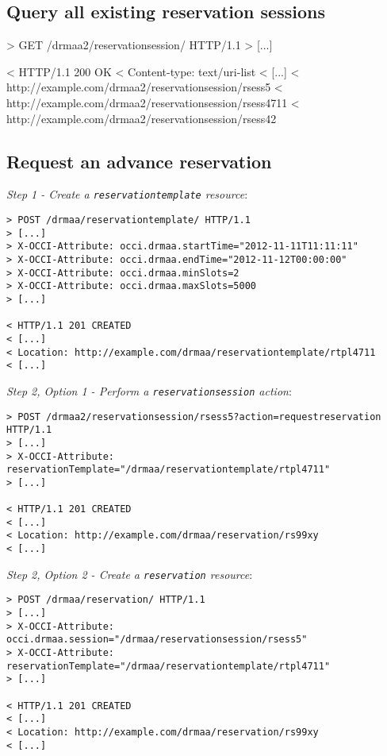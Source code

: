 \documentclass[10pt]{article}
\newcommand{\h}[1]{\lstinline|#1|}
\begin{document}
\subsection{Query all existing reservation sessions}

> GET /drmaa2/reservationsession/ HTTP/1.1
> [...]

< HTTP/1.1 200 OK 
< Content-type: text/uri-list
< [...]
< http://example.com/drmaa2/reservationsession/rsess5
< http://example.com/drmaa2/reservationsession/rsess4711
< http://example.com/drmaa2/reservationsession/rsess42

\subsection{Request an advance reservation}

\emph{Step 1 - Create a \h{reservationtemplate} resource}:

\begin{verbatim}
> POST /drmaa/reservationtemplate/ HTTP/1.1
> [...]
> X-OCCI-Attribute: occi.drmaa.startTime="2012-11-11T11:11:11"
> X-OCCI-Attribute: occi.drmaa.endTime="2012-11-12T00:00:00"
> X-OCCI-Attribute: occi.drmaa.minSlots=2
> X-OCCI-Attribute: occi.drmaa.maxSlots=5000
> [...]

< HTTP/1.1 201 CREATED 
< [...] 
< Location: http://example.com/drmaa/reservationtemplate/rtpl4711
< [...]
\end{verbatim}

\emph{Step 2, Option 1 - Perform a \h{reservationsession} action}:

\begin{verbatim}
> POST /drmaa2/reservationsession/rsess5?action=requestreservation HTTP/1.1
> [...]
> X-OCCI-Attribute: reservationTemplate="/drmaa/reservationtemplate/rtpl4711"
> [...]

< HTTP/1.1 201 CREATED 
< [...] 
< Location: http://example.com/drmaa/reservation/rs99xy
< [...]
\end{verbatim}

\emph{Step 2, Option 2 - Create a \h{reservation} resource}:

\begin{verbatim}
> POST /drmaa/reservation/ HTTP/1.1
> [...]
> X-OCCI-Attribute: occi.drmaa.session="/drmaa/reservationsession/rsess5"
> X-OCCI-Attribute: reservationTemplate="/drmaa/reservationtemplate/rtpl4711"
> [...]

< HTTP/1.1 201 CREATED 
< [...] 
< Location: http://example.com/drmaa/reservation/rs99xy
< [...]
\end{verbatim}
\end{document}

